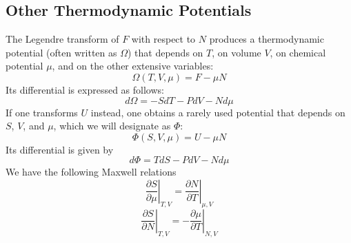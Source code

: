 \documentclass[cyan]{elegantnote}
\begin{document}
\subsection{Other Thermodynamic Potentials}
The Legendre transform of $F$ with respect to $N$ produces a thermodynamic potential (often written as $\Omega$) that depends on $T$, on volume $V$, on chemical potential $\mu$, and on the other extensive variables:
\[\Omega(T,V,\mu) = F - \mu N\]
Its differential is expressed as follows:
\[d\Omega = -SdT - PdV - Nd\mu\]
If one transforms $U$ instead, one obtains a rarely used potential that depends on $S$, $V$, and $\mu$, which we will designate as $\Phi$:
\[\Phi(S,V,\mu) = U - \mu N\]
Its differential is given by
\[d\Phi = TdS - PdV - Nd\mu\]
We have the following Maxwell relations
\[\left. \frac{\partial S}{\partial \mu} \right|_{T,V} = \left. \frac{\partial N}{\partial T} \right|_{\mu,V}\]
\[\left. \frac{\partial S}{\partial N} \right|_{T,V} = - \left. \frac{\partial \mu}{\partial T} \right|_{N,V}\]
\end{document}
